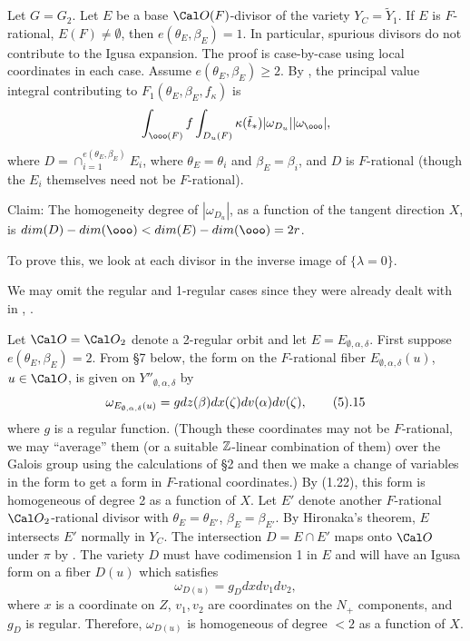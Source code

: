 Let $G=G_2$.
Let $E$ be a base ${\Cal O}(F)$-divisor of the 
variety $Y_C=\tilde{Y}_1$. If $E$ is $F$-rational, $E(F)\not= \emptyset$,
then $e(\theta_E,\beta_E)=1$. In particular, spurious divisors
do not contribute to the Igusa expansion.
\endproclaim
{} The proof is case-by-case using local coordinates in each case.
Assume $e(\theta_E,\beta_E)\geq 2$. By \cite{L}, the
principal value integral contributing to 
$F_1(\theta_E,\beta_E,f_\kappa)$ is
$$
\int_{\ooo(F)}f\int_{D_u(F)}\kappa(\tilde{t}_*)
|\omega_{D_u}||\omega_{\ooo}|,
$$
where $D=\cap_{i=1}^{e(\theta_E,\beta_E)}E_i$, 
where $\theta_E=\theta_i$ and $\beta_E=\beta_i$,
and $D$ is $F$-rational (though the $E_i$ themselves need not be
$F$-rational). 

Claim: The homogeneity degree of $|\omega_{D_u}|$, as a function
of the tangent direction $X$, is $dim(D)-dim(\ooo)<dim(E)-dim(\ooo)=2r$.

To prove this, we look at each divisor in the inverse image of
$\{\lambda =0\}$. 

We may omit the regular and 1-regular cases since they were already
dealt with in \cite{H1}, \cite{LS2}.

Let ${\Cal O}={\Cal O}_2$ denote a 2-regular orbit and let 
$E=E_{\emptyset, \alpha,\delta}$. 
First suppose $e(\theta_E,\beta_E)=2$.
From \S 7 below, the form on the $F$-rational fiber
$E_{\emptyset,\alpha,\delta}(u)$, $u\in {\Cal O}$, is given 
on $Y''_{\emptyset,\alpha,\delta}$ by
$$
\omega_{E_{\emptyset,\alpha,\delta}(u)}
=gdz(\beta)dx(\zeta)dv(\alpha)dv(\zeta),
\tag 5.15
$$
where $g$ is a regular function.
(Though these coordinates may not be $F$-rational, we
may ``average'' them (or a suitable ${\Bbb Z}$-linear combination of them)
over the Galois group using the calculations of \S 2
and then we make a change
of variables in the form to get a form in $F$-rational coordinates.)
By (1.22), this form is homogeneous
of degree 2 as a function of $X$. Let $E'$ denote another 
$F$-rational ${\Cal O}_2$-rational divisor with
$\theta_E=\theta_{E'}$, $\beta_E =\beta_{E'}$. By Hironaka's theorem,
$E$ intersects $E'$ normally in $Y_C$. The intersection $D=E\cap E'$
maps onto ${\Cal O}$ under $\pi$ by \cite{DG, chap II, Prop 3.1}. 
The variety $D$ must have codimension 1 in $E$ and will have
an Igusa form on 
a fiber $D(u)$ which satisfies
$$
\omega_{D(u)}=g_Ddx dv_1dv_2,
$$
where $x$ is a coordinate on $Z$, $v_1,v_2$ are coordinates on the
$N_+$ components, and $g_D$ is regular. Therefore, $\omega_{D(u)}$
is homogeneous of degree $<2$ as a function of $X$. 

